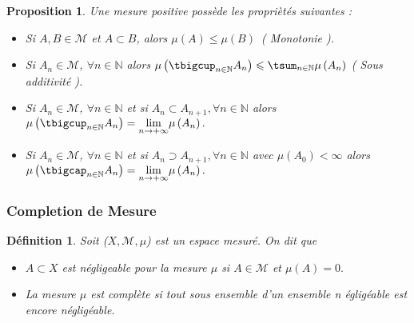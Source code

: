\documentclass[3pt]{article}
\newtheorem{definition}[theorem]{D\'{e}finition}
\newtheorem{proposition}[theorem]{Proposition}
\begin{document}
\bigskip

\begin{proposition}
Une mesure positive poss\`{e}de les propri\`{e}t\'{e}s suivantes :

\begin{itemize}
\item Si $A,B\in \mathcal{M}$ et $A\subset B$, alors $\mu (A)\leqslant \mu
\left( B\right) $\ ( Monotonie ).

\item Si $A_{n}\in \mathcal{M}$, $\forall n\in \mathbb{N}$ alors $\mu \left(
\tbigcup_{n\in \mathbb{N}}A_{n}\right) \leqslant \tsum_{n\in \mathbb{N}}\mu
\left( A_{n}\right) $ ( Sous additivit\'{e} ).

\item Si $A_{n}\in \mathcal{M}$, $\forall n\in \mathbb{N}$ et si $%
A_{n}\subset A_{n+1},\forall n\in \mathbb{N}$ alors $\mu \left(
\tbigcup_{n\in \mathbb{N}}A_{n}\right) =\underset{n\rightarrow +\infty }{%
\lim }\mu \left( A_{n}\right) .$

\item Si $A_{n}\in \mathcal{M}$, $\forall n\in \mathbb{N}$ et si $%
A_{n}\supset A_{n+1},\forall n\in \mathbb{N}$ avec $\mu \left( A_{0}\right)
<\infty $ alors $\mu \left( \tbigcap_{n\in \mathbb{N}}A_{n}\right) =\underset%
{n\rightarrow +\infty }{\lim }\mu \left( A_{n}\right) .$
\end{itemize}
\end{proposition}

\subsubsection{Completion de Mesure}

\bigskip

\begin{definition}
Soit ($X,\mathcal{M},\mu $) est un espace mesur\'{e}. On dit que

\begin{itemize}
\item $A\subset X$ est n\'{e}gligeable pour la mesure $\mu $ si $A\in 
\mathcal{M}$ et $\mu (A)=0.$

\item La mesure $\mu $ est compl\`{e}te si tout sous ensemble d'un ensemble n%
\'{e}glig\'{e}able est encore n\'{e}glig\'{e}able.
\end{itemize}
\end{definition}

\bigskip
\end{document}
